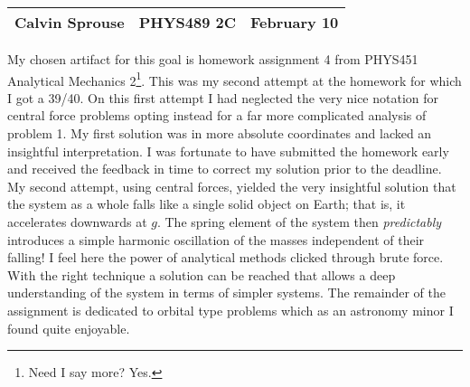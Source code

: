 \documentclass[a4paper, 12pt]{config/homework}
\begin{document}
\noindent
\begin{tabularx}{\textwidth}{>{\centering\arraybackslash}X>{\centering\arraybackslash}X>{\centering\arraybackslash}X}
Calvin Sprouse & PHYS489 2C & 2024 February 10\\
\midrule
\end{tabularx}



My chosen artifact for this goal is homework assignment 4 from PHYS451 Analytical Mechanics 2\footnote{Need I say more? Yes.}. This was my second attempt at the homework for which I got a 39/40. On this first attempt I had neglected the very nice notation for central force problems opting instead for a far more complicated analysis of problem 1. My first solution was in more absolute coordinates and lacked an insightful interpretation. I was fortunate to have submitted the homework early and received the feedback in time to correct my solution prior to the deadline. My second attempt, using central forces, yielded the very insightful solution that the system as a whole falls like a single solid object on Earth; that is, it accelerates downwards at \(g\). The spring element of the system then \textit{predictably} introduces a simple harmonic oscillation of the masses independent of their falling! I feel here the power of analytical methods clicked through brute force. With the right technique a solution can be reached that allows a deep understanding of the system in terms of simpler systems. The remainder of the assignment is dedicated to orbital type problems which as an astronomy minor I found quite enjoyable.


\end{document}
